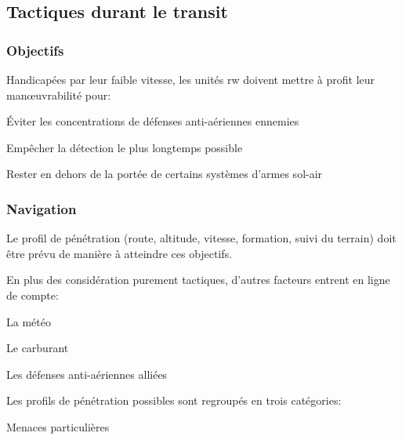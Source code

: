 \subsection{Tactiques durant le transit}

\subsubsection{Objectifs}

\e
	\item Handicapées par leur faible vitesse, les unités \gls{rw} doivent mettre à profit leur manœuvrabilité pour:
	\ee
		\item Éviter les concentrations de défenses anti-aériennes ennemies
		\item Empêcher la détection le plus longtemps possible
		\item Rester en dehors de la portée de certains systèmes d'armes sol-air
	\ed
\ed

\subsubsection{Navigation}

\e
	\item Le profil de pénétration (route, altitude, vitesse, formation, suivi du terrain) doit être prévu de manière à atteindre ces objectifs.
	\item En plus des considération purement tactiques, d'autres facteurs entrent en ligne de compte:
	\ee
		\item La météo
		\item Le carburant
		\item Les défenses anti-aériennes alliées
	\ed
	\item Les profils de pénétration possibles sont regroupés en trois catégories:

	\item Menaces particulières

